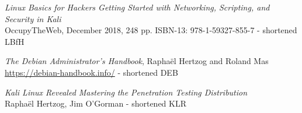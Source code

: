 \documentclass[Screen16to9,17pt]{foils}
\begin{document}
\begin{list2}
\item \emph{Linux Basics for Hackers Getting Started with Networking, Scripting, and Security in Kali}\\
OccupyTheWeb, December 2018, 248 pp. ISBN-13: 978-1-59327-855-7 - shortened LBfH
\item \emph{The Debian Administrator’s Handbook}, Raphaël Hertzog and Roland Mas\\
\url{https://debian-handbook.info/} - shortened DEB
\item \emph{Kali Linux Revealed  Mastering the Penetration Testing Distribution}\\
Raphaël Hertzog, Jim O'Gorman - shortened KLR
\end{list2}


\myquestionspage
\end{document}
